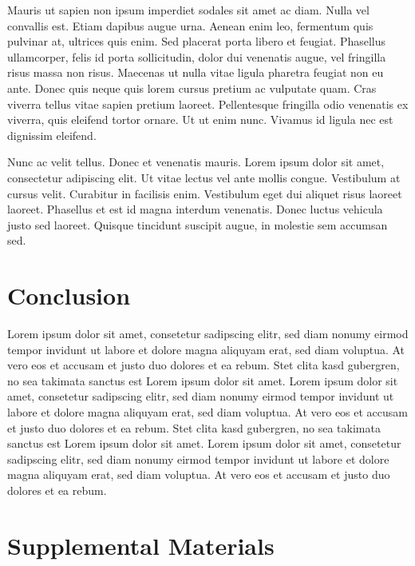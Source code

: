 \documentclass[journal]{vgtc}                %
\begin{document}
Mauris ut sapien non ipsum imperdiet sodales sit amet ac diam.
Nulla vel convallis est.
Etiam dapibus augue urna.
Aenean enim leo, fermentum quis pulvinar at, ultrices quis enim.
Sed placerat porta libero et feugiat.
Phasellus ullamcorper, felis id porta sollicitudin, dolor dui venenatis augue, vel fringilla risus massa non risus.
Maecenas ut nulla vitae ligula pharetra feugiat non eu ante.
Donec quis neque quis lorem cursus pretium ac vulputate quam.
Cras viverra tellus vitae sapien pretium laoreet.
Pellentesque fringilla odio venenatis ex viverra, quis eleifend tortor ornare.
Ut ut enim nunc.
Vivamus id ligula nec est dignissim eleifend.

Nunc ac velit tellus.
Donec et venenatis mauris.
Lorem ipsum dolor sit amet, consectetur adipiscing elit.
Ut vitae lectus vel ante mollis congue.
Vestibulum at cursus velit.
Curabitur in facilisis enim.
Vestibulum eget dui aliquet risus laoreet laoreet.
Phasellus et est id magna interdum venenatis.
Donec luctus vehicula justo sed laoreet.
Quisque tincidunt suscipit augue, in molestie sem accumsan sed.

\section{Conclusion}

Lorem ipsum dolor sit amet, consetetur sadipscing elitr, sed diam nonumy eirmod tempor invidunt ut labore et dolore magna aliquyam erat, sed diam voluptua.
At vero eos et accusam et justo duo dolores et ea rebum.
Stet clita kasd gubergren, no sea takimata sanctus est Lorem ipsum dolor sit amet.
Lorem ipsum dolor sit amet, consetetur sadipscing elitr, sed diam nonumy eirmod tempor invidunt ut labore et dolore magna aliquyam erat, sed diam voluptua.
At vero eos et accusam et justo duo dolores et ea rebum.
Stet clita kasd gubergren, no sea takimata sanctus est Lorem ipsum dolor sit amet.
Lorem ipsum dolor sit amet, consetetur sadipscing elitr, sed diam nonumy eirmod tempor invidunt ut labore et dolore magna aliquyam erat, sed diam voluptua.
At vero eos et accusam et justo duo dolores et ea rebum.




\section*{Supplemental Materials}
\label{sec:supplemental_materials}
\end{document}

